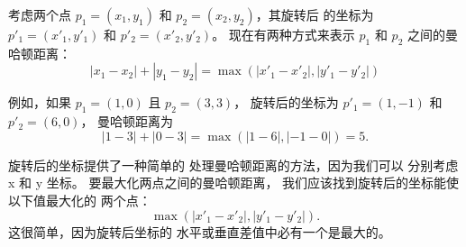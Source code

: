 考虑两个点 $p_1=(x_1,y_1)$ 和 $p_2=(x_2,y_2)$，其旋转后
的坐标为 $p'_1=(x'_1,y'_1)$ 和 $p'_2=(x'_2,y'_2)$。
现在有两种方式来表示
$p_1$ 和 $p_2$ 之间的曼哈顿距离：
\[|x_1-x_2|+|y_1-y_2| = \max(|x'_1-x'_2|,|y'_1-y'_2|)\]

例如，如果 $p_1=(1,0)$ 且 $p_2=(3,3)$，
旋转后的坐标为 $p'_1=(1,-1)$ 和 $p'_2=(6,0)$，
曼哈顿距离为
\[|1-3|+|0-3| = \max(|1-6|,|-1-0|) = 5.\]

旋转后的坐标提供了一种简单的
处理曼哈顿距离的方法，因为我们可以
分别考虑 x 和 y 坐标。
要最大化两点之间的曼哈顿距离，
我们应该找到旋转后的坐标能使以下值最大化的
两个点：
\[\max(|x'_1-x'_2|,|y'_1-y'_2|).\]
这很简单，因为旋转后坐标的
水平或垂直差值中必有一个是最大的。

